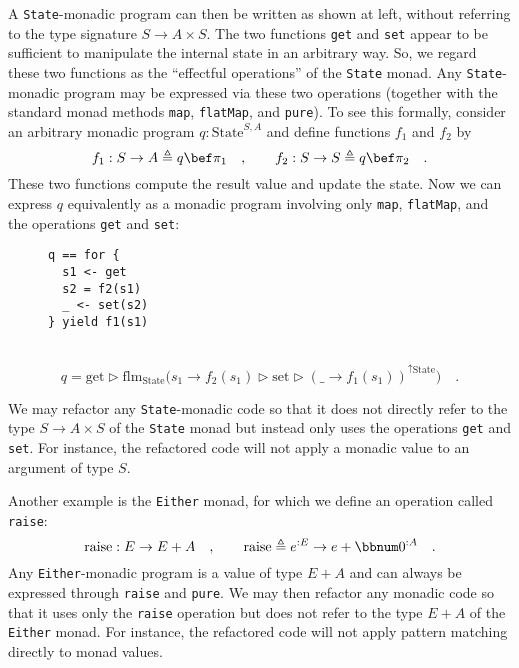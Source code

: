 A \lstinline!State!-monadic program can then be written as shown
at left, without referring to the type signature $S\rightarrow A\times S$.
The two functions \lstinline!get! and \lstinline!set! appear to
be sufficient to manipulate the internal state in an arbitrary way.
So, we regard these two functions as the \textsf{``}effectful operations\textsf{''}
of the \lstinline!State! monad. Any \lstinline!State!-monadic program
may be expressed via these two operations (together with the standard
monad methods \lstinline!map!, \lstinline!flatMap!, and \lstinline!pure!).
To see this formally, consider an arbitrary monadic program $q:\text{State}^{S,A}$
and define functions $f_{1}$ and $f_{2}$ by
\[
f_{1}:S\rightarrow A\triangleq q\bef\pi_{1}\quad,\quad\quad f_{2}:S\rightarrow S\triangleq q\bef\pi_{2}\quad.
\]
These two functions compute the result value and update the state.
Now we can express $q$ equivalently as a monadic program involving
only \lstinline!map!, \lstinline!flatMap!, and the operations \lstinline!get!
and \lstinline!set!:

\begin{wrapfigure}{l}{0.35\columnwidth}%
\vspace{-0.6\baselineskip}

\begin{lstlisting}
q == for {
  s1 <- get
  s2 = f2(s1)
  _ <- set(s2)
} yield f1(s1)
\end{lstlisting}
\vspace{0.4\baselineskip}
\end{wrapfigure}%

~\vspace{-0.9\baselineskip}
\[
q=\text{get}\triangleright\text{flm}_{\text{State}}\big(s_{1}\rightarrow f_{2}(s_{1})\triangleright\text{set}\triangleright(\_\rightarrow f_{1}(s_{1}))^{\uparrow\text{State}}\big)\quad.
\]

We may refactor any \lstinline!State!-monadic code so that it does
not directly refer to the type $S\rightarrow A\times S$ of the \lstinline!State!
monad but instead only uses the operations \lstinline!get! and \lstinline!set!.
For instance, the refactored code will not apply a monadic value to
an argument of type $S$.

Another example is the \lstinline!Either! monad, for which we define
an operation called \lstinline!raise!:
\[
\text{raise}:E\rightarrow E+A\quad,\quad\quad\text{raise}\triangleq e^{:E}\rightarrow e+\bbnum 0^{:A}\quad.
\]
Any \lstinline!Either!-monadic program is a value of type $E+A$
and can always be expressed through \lstinline!raise! and \lstinline!pure!.
We may then refactor any monadic code so that it uses only the \lstinline!raise!
operation but does not refer to the type $E+A$ of the \lstinline!Either!
monad. For instance, the refactored code will not apply pattern matching
directly to monad values.


